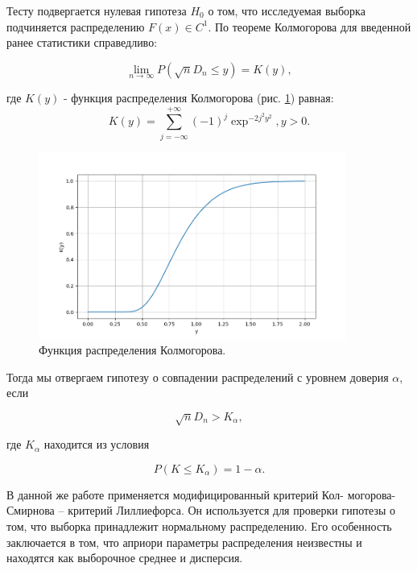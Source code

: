 \documentclass[a4paper,14pt]{extarticle}
\begin{document}
    Тесту подвергается нулевая гипотеза $H_0$ о том, что исследуемая выборка подчиняется распределению
    $F(x) \in C^1$. По теореме Колмогорова для введенной ранее статистики справедливо:
    
    \begin{equation}
      \lim_{n \rightarrow \infty} P(\sqrt{n}D_n \leq y) = K(y),
    \end{equation}
    
    \noindent где $K(y)$ - функция распределения Колмогорова (рис. \ref{fig:kolmogorov}) равная:
    \begin{equation}
      K(y) = \sum_{j=-\infty}^{+\infty} (-1)^j\exp^{-2j^2y^2}, y > 0.
    \end{equation}
    
    \begin{figure}
        \center
        \includegraphics[width=0.9\textwidth]{kolmogorov.png}
        \captionsetup{width=0.8\textwidth}
        \caption{Функция распределения Колмогорова.}
        \label{fig:kolmogorov}
    \end{figure}
    
    Тогда мы отвергаем гипотезу о совпадении распределений с уровнем доверия $\alpha$, если
    
    \begin{equation}
      \sqrt{n}D_n > K_{\alpha},
    \end{equation}
    
    \noindent где $K_{\alpha}$ находится из условия

    \begin{equation}
      P(K \leq K_{\alpha}) = 1 - \alpha.
    \end{equation}
    
    В данной же работе применяется модифицированный критерий Кол- могорова-Смирнова -- 
    критерий Лиллиефорса\cite{lilliefors}. Он используется для проверки гипотезы о том, что
    выборка принадлежит нормальному распределению. Его особенность заключается в том, что
    априори параметры распределения неизвестны и находятся как выборочное среднее и дисперсия.
    
\end{document}

